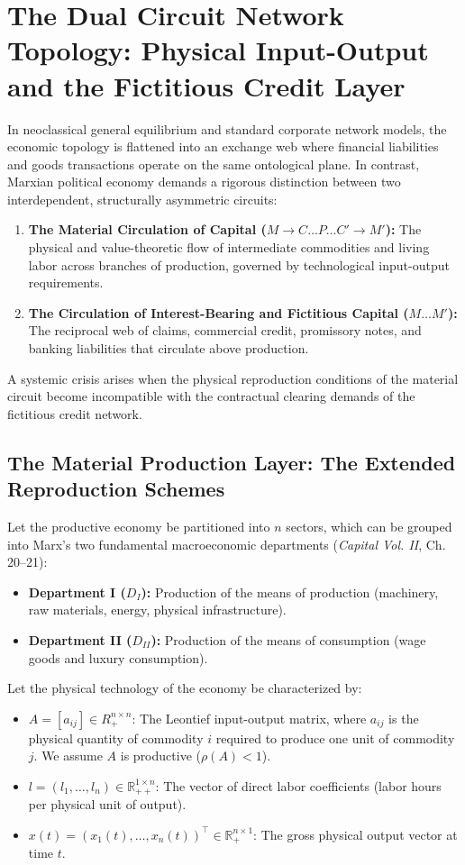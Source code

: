 \documentclass[11pt,letterpaper]{report}
\begin{document}
\section{The Dual Circuit Network Topology: Physical Input-Output and the Fictitious Credit Layer}
In neoclassical general equilibrium and standard corporate network models, the economic topology is flattened into an exchange web where financial liabilities and goods transactions operate on the same ontological plane. In contrast, Marxian political economy demands a rigorous distinction between two interdependent, structurally asymmetric circuits:

\begin{enumerate}
\item \textbf{The Material Circulation of Capital ($M \to C \dots P \dots C' \to M'$):} The physical and value-theoretic flow of intermediate commodities and living labor across branches of production, governed by technological input-output requirements.
\item \textbf{The Circulation of Interest-Bearing and Fictitious Capital ($M \dots M'$):} The reciprocal web of claims, commercial credit, promissory notes, and banking liabilities that circulate above production.
\end{enumerate}
A systemic crisis arises when the physical reproduction conditions of the material circuit become incompatible with the contractual clearing demands of the fictitious credit network.

\subsection{The Material Production Layer: The Extended Reproduction Schemes}
Let the productive economy be partitioned into $n$ sectors, which can be grouped into Marx's two fundamental macroeconomic departments (\emph{Capital Vol. II}, Ch. 20--21):

\begin{itemize}
\item \textbf{Department I (${D}_{I}$):} Production of the means of production (machinery, raw materials, energy, physical infrastructure).
\item \textbf{Department II (${D}_{II}$):} Production of the means of consumption (wage goods and luxury consumption).
\end{itemize}
Let the physical technology of the economy be characterized by:

\begin{itemize}
\item $A=[{a}_{ij}]\in {R}_{+}^{n\times n}$: The Leontief input-output matrix, where ${a}_{ij}$ is the physical quantity of commodity $i$ required to produce one unit of commodity $j$. We assume $A$ is productive ($\rho (A)<1$).
\item $l = (l_1, \dots, l_n) \in \mathbb{R}_{++}^{1 \times n}$: The vector of direct labor coefficients (labor hours per physical unit of output).
\item $x(t) = (x_1(t), \dots, x_n(t))^\top \in \mathbb{R}_{+}^{n \times 1}$: The gross physical output vector at time $t$.
\end{itemize}
\end{document}
